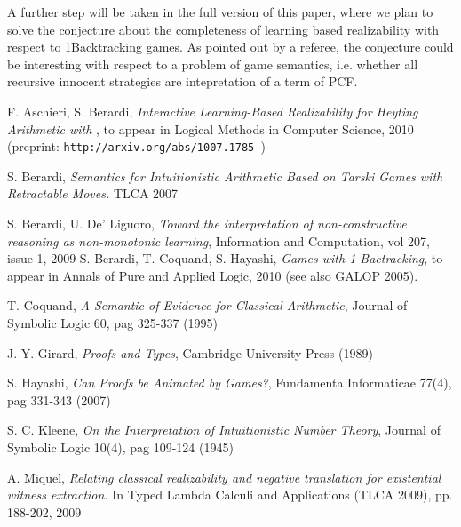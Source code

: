 \documentclass[copyright,creativecommons]{eptcs}
\newcommand{\comment}[1]{}
\begin{document}
A further step will be taken in the full version of this paper, where we plan to solve the conjecture about the completeness of learning based realizability with respect to 1Backtracking games. As pointed out by a referee, the conjecture could be interesting with respect to a problem of game semantics, i.e. whether all recursive innocent strategies are intepretation of a term of PCF.






\begin{thebibliography}{99}

\comment{\bibitem{Aschierifull} F.Aschieri, \emph{Interactive Learning Based Realizability and 1Backtracking Games}(Full Version), ( \texttt{http://www.di.unito.it/aschieri/1Back.pdf })}
 F. Aschieri, S. Berardi,
\emph{Interactive Learning-Based Realizability for Heyting Arithmetic with }, to appear in Logical Methods in Computer Science, 2010 (preprint: \texttt{http://arxiv.org/abs/1007.1785 })



 S. Berardi, \emph{Semantics for Intuitionistic Arithmetic Based on Tarski Games with Retractable Moves.} TLCA 2007

S. Berardi, U. De' Liguoro, \emph{Toward the interpretation of non-constructive reasoning as non-monotonic learning}, Information and Computation, vol 207, issue 1, 2009
S. Berardi, T. Coquand, S. Hayashi,
\emph{Games with 1-Bactracking}, to appear in Annals of Pure and Applied Logic, 2010
(see also GALOP 2005). 



T. Coquand,
\emph{A Semantic of Evidence for Classical Arithmetic},
Journal of Symbolic Logic 60, pag 325-337 (1995)


J.-Y. Girard,
\emph{Proofs and Types},
Cambridge University Press (1989)




S. Hayashi,
\emph{Can Proofs be Animated by Games?},
Fundamenta Informaticae 77(4), pag 331-343 (2007)


S. C. Kleene,
\emph{On the Interpretation of Intuitionistic Number Theory},
Journal of Symbolic Logic 10(4), pag 109-124 (1945)

 A. Miquel, \emph{Relating classical realizability and negative translation for existential witness extraction.} In Typed Lambda Calculi and Applications  (TLCA 2009), pp. 188-202, 2009


\end{thebibliography}
\end{document}
